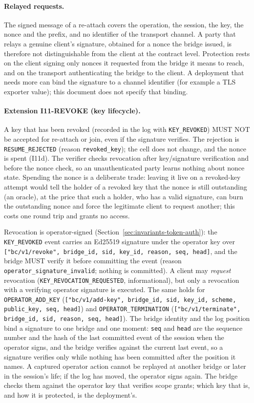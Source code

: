 \paragraph{Relayed requests.} The signed message of a re-attach covers
the operation, the session, the key, the nonce and the prefix, and no
identifier of the transport channel. A party that relays a genuine client's signature,
obtained for a nonce the bridge issued, is therefore not distinguishable
from the client at the contract level. Protection rests on the client
signing only nonces it requested from the bridge it means to reach, and
on the transport authenticating the bridge to the client. A deployment
that needs more can bind the signature to a channel identifier (for
example a TLS exporter value); this document does not specify that
binding.

\paragraph{Extension I11-REVOKE (key lifecycle).}
A key that has been revoked (recorded in the log with
\texttt{KEY\_REVOKED}) MUST NOT be accepted for re-attach or join,
even if the signature verifies. The rejection is
\texttt{RESUME\_REJECTED} (reason \texttt{revoked\_key}); the cell
does not change, and the nonce is spent (I11d). The verifier checks
revocation after key/signature verification and before the nonce
check, so an unauthenticated party learns nothing about nonce state.
Spending the nonce is a deliberate trade: leaving it live on a
revoked-key attempt would tell the holder of a revoked key that the
nonce is still outstanding (an oracle), at the price that such a holder,
who has a valid signature, can burn the outstanding nonce and force the
legitimate client to request another; this costs one round trip and
grants no access.

Revocation is operator-signed (Section~\ref{sec:invariants-token-auth}): the \texttt{KEY\_REVOKED}
event carries an Ed25519 signature under the operator key over
\texttt{["bc/v1/revoke", bridge\_id, sid, key\_id, reason, seq, head]},
and the bridge MUST verify it before committing the event (reason
\texttt{operator\_signature\_invalid}; nothing is committed). A client
may \emph{request} revocation (\texttt{KEY\_REVOCATION\_REQUESTED},
informational), but only a revocation with a verifying operator signature
is executed. The same holds for \texttt{OPERATOR\_ADD\_KEY}
(\texttt{["bc/v1/add-key", bridge\_id, sid, key\_id, scheme, public\_key,
seq, head]}) and \texttt{OPERATOR\_TERMINATION}
(\texttt{["bc/v1/terminate", bridge\_id, sid, reason, seq, head]}). The
bridge identity and the log position bind a signature to one bridge and
one moment: \texttt{seq} and \texttt{head} are the sequence number and the
hash of the last committed event of the session when the operator signs,
and the bridge verifies against the current last event, so a signature
verifies only while nothing has been committed after the position it names.
A captured operator action cannot be replayed at another bridge or later in
the session's life; if the log has moved, the operator signs again. The
bridge checks them against the operator key that
verifies scope grants; which key that is, and how it is protected, is
the deployment's.

